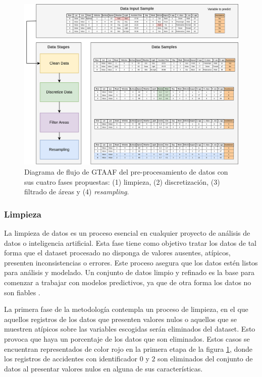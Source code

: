\documentclass{uathesis-es}
\begin{document}
	\begin{figure}[H]
		\centering
		\includegraphics[width=17cm]{Figures/Preprocessing.png}
		\caption{Diagrama de flujo de GTAAF del pre-procesamiento de datos con sus cuatro fases propuestas: (1) limpieza, (2) discretización, (3) filtrado de áreas y (4) \textit{resampling}.}
		\label{PreprocessingStage}
	\end{figure}
	
	\subsubsection{Limpieza}
	
	La limpieza de datos es un proceso esencial en cualquier proyecto de análisis de datos o inteligencia artificial. Esta fase tiene como objetivo tratar los datos de tal forma que el dataset procesado no disponga de valores ausentes, atípicos, presenten inconsistencias o errores. Este proceso asegura que los datos estén listos para análisis y modelado. Un conjunto de datos limpio y refinado es la base para comenzar a trabajar con modelos predictivos, ya que de otra forma los datos no son fiables \cite{ilyas2019data}.
	
	La primera fase de la metodología contempla un proceso de limpieza, en el que aquellos registros de los datos que presenten valores nulos o aquellos que se muestren atípicos sobre las variables escogidas serán eliminados del dataset. Esto provoca que haya un porcentaje de los datos que son eliminados. Estos casos se encuentran representados de color rojo en la primera etapa de la figura \ref{PreprocessingStage}, donde los registros de accidentes con identificador $0$ y $2$ son eliminados del conjunto de datos al presentar valores nulos en alguna de sus características.
	
\end{document}
